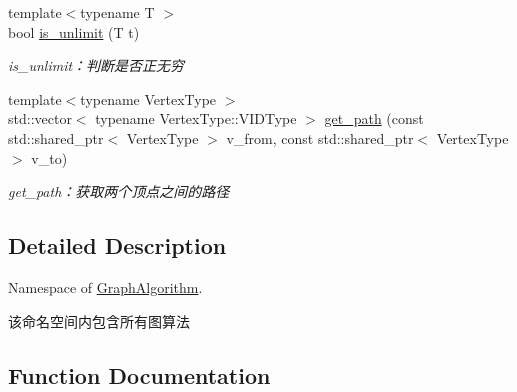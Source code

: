 \begin{DoxyCompactItemize}
{\footnotesize template$<$typename T $>$ }\\bool \hyperlink{namespace_introduction_to_algorithm_1_1_graph_algorithm_a4f664c13605fc87ca8d26f4aad5a9fa2}{is\+\_\+unlimit} (T t)
\begin{DoxyCompactList}\small\item\em is\+\_\+unlimit：判断是否正无穷 \end{DoxyCompactList}\item 
{\footnotesize template$<$typename Vertex\+Type $>$ }\\std\+::vector$<$ typename Vertex\+Type\+::\+V\+I\+D\+Type $>$ \hyperlink{namespace_introduction_to_algorithm_1_1_graph_algorithm_a1581960f77507024b39572aeb6d1fbd6}{get\+\_\+path} (const std\+::shared\+\_\+ptr$<$ Vertex\+Type $>$ v\+\_\+from, const std\+::shared\+\_\+ptr$<$ Vertex\+Type $>$ v\+\_\+to)
\begin{DoxyCompactList}\small\item\em get\+\_\+path：获取两个顶点之间的路径 \end{DoxyCompactList}\end{DoxyCompactItemize}


\subsection{Detailed Description}
Namespace of \hyperlink{namespace_introduction_to_algorithm_1_1_graph_algorithm}{Graph\+Algorithm}. 

该命名空间内包含所有图算法 

\subsection{Function Documentation}
\hypertarget{namespace_introduction_to_algorithm_1_1_graph_algorithm_a9c57b397479972f84b4b10bc19968297}{}

